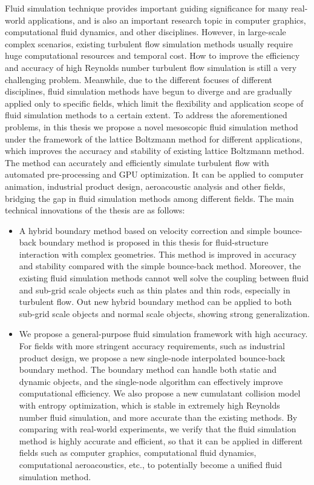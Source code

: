 \begin{abstract*}[flattitle]
  Fluid simulation technique provides important guiding significance for many real-world applications, and is also an important research topic in computer graphics, computational fluid dynamics, and other disciplines.
  However, in large-scale complex scenarios, existing turbulent flow simulation methods usually require huge computational resources and temporal cost.
  How to improve the efficiency and accuracy of high Reynolds number turbulent flow simulation is still a very challenging problem.
  Meanwhile, due to the different focuses of different disciplines, fluid simulation methods have begun to diverge and are gradually applied only to specific fields, which limit the flexibility and application scope of fluid simulation methods to a certain extent.
  To address the aforementioned problems, in this thesis we propose a novel mesoscopic fluid simulation method under the framework of the lattice Boltzmann method for different applications, which improves the accuracy and stability of existing lattice Boltzmann method. The method can accurately and efficiently simulate turbulent flow with automated pre-processing and GPU optimization. It can be applied to computer animation, industrial product design, aeroacoustic analysis and other fields, bridging the gap in fluid simulation methods among different fields. The main technical innovations of the thesis are as follows:
  \begin{itemize}
    \item A hybrid boundary method based on velocity correction and simple bounce-back boundary method is proposed in this thesis for fluid-structure interaction with complex geometries. This method is improved in accuracy and stability compared with the simple bounce-back method. Moreover, the existing fluid simulation methods cannot well solve the coupling between fluid and sub-grid scale objects such as thin plates and thin rods, especially in turbulent flow. Out new hybrid boundary method can be applied to both sub-grid scale objects and normal scale objects, showing strong generalization.
    \item We propose a general-purpose fluid simulation framework with high accuracy. For fields with more stringent accuracy requirements, such as industrial product design, we propose a new single-node interpolated bounce-back boundary method. The boundary method can handle both static and dynamic objects, and the single-node algorithm can effectively improve computational efficiency. We also propose a new cumulatant collision model with entropy optimization, which is stable in extremely high Reynolds number fluid simulation, and more accurate than the existing methods. By comparing with real-world experiments, we verify that the fluid simulation method is highly accurate and efficient, so that it can be applied in different fields such as computer graphics, computational fluid dynamics, computational aeroacoustics, etc., to potentially become a unified fluid simulation method.

\end{itemize}
\end{abstract*}
